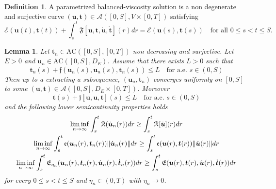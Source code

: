 \documentclass[letterpaper,oneside]{amsart}
\numberwithin{equation}{section}
\newtheorem{lemma}[theorem]{Lemma}
\theoremstyle{definition}
\newtheorem{defi}[prop]{Definition}
\DeclarePairedDelimiter{\norm}{\lVert}{\rVert}
\begin{document}
\begin{defi}
A parametrized balanced-viscosity solution is a non degenerate and surjective curve $(\boldsymbol{u},\boldsymbol{t})\in\mathscr{A}([0,S],V\times[0,T])$ satisfying
\[
\mathcal{E}(\boldsymbol{u}(t),\boldsymbol{t}(t))+\int_s^t\mathfrak{F}[\boldsymbol{u},\boldsymbol{t},\dot{\boldsymbol{u}},\dot{\boldsymbol{t}}](r)dr=\mathcal{E}(\boldsymbol{u}(s),\boldsymbol{t}(s))\quad\text{for all $0\le s<t\le S$}.
\]
\end{defi}
\begin{lemma}
\label{lemma:compactness-parametrized}
Let $\boldsymbol{t}_n\in\text{AC}([0,S],[0,T])$ non decreasing and surjective. Let $E>0$ and $\boldsymbol{u}_n\in\text{AC}([0,S],D_E)$. Assume that there exists $L>0$ such that
\begin{equation}
\label{eqn:parametrized-curves-estimate-for-compactness}
\dot{\boldsymbol{t}}_n(s)+\mathfrak{f}(\boldsymbol{u}_n(s),\dot{\boldsymbol{u}}_n(s),\boldsymbol{t}_n(s))\le L\quad\text{for a.e.\ $s\in(0,S)$}
\end{equation}
Then up to a extracting a subsequence, $(\boldsymbol{u}_n,\boldsymbol{t}_n)$ converges uniformly on $[0,S]$ to some $(\boldsymbol{u},\boldsymbol{t})\in\mathscr{A}([0,S],D_E\times[0,T])$. Moreover
\[
\dot{\boldsymbol{t}}(s)+\mathfrak{f}[\boldsymbol{u},\dot{\boldsymbol{u}},\boldsymbol{t}](s)\le L\quad\text{for a.e.\ $s\in(0,S)$}
\]
and the following lower semicontinuity properties holds
\begin{gather*}
\liminf_{n\to\infty}\int_s^t\mathcal{R}(\dot{\boldsymbol{u}}_n(r))dr\ge\int_s^t\mathcal{R}[\dot{\boldsymbol{u}}](r)dr \\
\liminf_{n\to\infty}\int_s^t\mathfrak{e}(\boldsymbol{u}_n(r),\boldsymbol{t}_n(r))\norm{\dot{\boldsymbol{u}}_n(r)}dr\ge\int_s^t\mathfrak{e}(\boldsymbol{u}(r),\boldsymbol{t}(r))\norm{\dot{\boldsymbol{u}}(r)}dr \\
\liminf_{n\to\infty}\int_s^t\mathfrak{E}_{\eta_n}(\boldsymbol{u}_n(r),\boldsymbol{t}_n(r),\dot{\boldsymbol{u}}_n(r),\dot{\boldsymbol{t}}_n(r))dr\ge\int_s^t\mathfrak{E}(\boldsymbol{u}(r),\boldsymbol{t}(r),\dot{\boldsymbol{u}}(r),\dot{\boldsymbol{t}}(r))dr
\end{gather*}
for every $0\le s<t\le S$ and $\eta_n\in(0,T)$ with $\eta_n\to0$.
\end{lemma}
\end{document}
